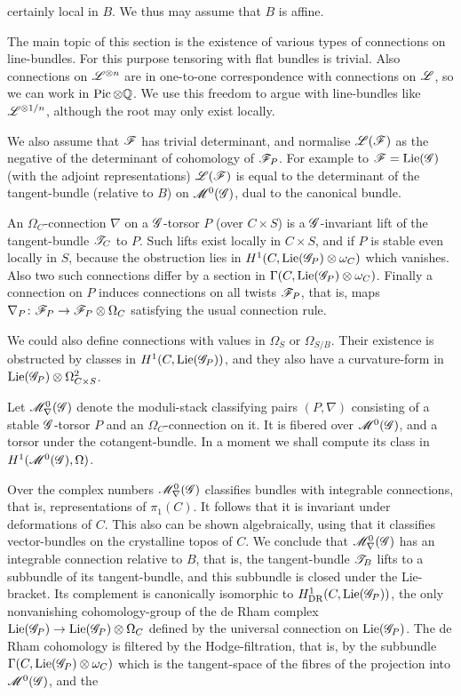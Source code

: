 \documentclass[12pt,english]{smfart}
\theoremstyle{plain} \newtheorem{innerthm}{Theorem} \newtheorem{innerlem}{Lemma} \newtheorem{innerprop}{Proposition} \newtheorem{innercor}{Corollary} \theoremstyle{definition} \newtheorem{innerdefn}{Definition} \newtheorem{innerconstr}{Construction} \theoremstyle{remark} \newtheorem*{remark}{Remark} \newtheorem*{remarks}{Remarks} \newtheorem*{applications}{Applications}
\begin{document}

certainly local in $B$. We thus may assume that $B$ is affine.

The main topic of this section is the existence of various types of connections on line-bundles. For this purpose tensoring with flat bundles is trivial. Also connections on $\mathscr{L}^{\otimes n}$ are in one-to-one correspondence with connections on $\mathscr{L}$, so we can work in $\operatorname{Pic}\otimes\mathbb{Q}$. We use this freedom to argue with line-bundles like $\mathscr{L}^{\otimes 1/n}$, although the root may only exist locally.

We also assume that $\mathscr{F}$ has trivial determinant, and normalise $\mathscr{L}(\mathscr{F})$ as the negative of the determinant of cohomology of $\mathscr{F}_P$. For example to $\mathscr{F}=\operatorname{Lie}(\mathscr{G})$ (with the adjoint representations) $\mathscr{L}(\mathscr{F})$ is equal to the determinant of the tangent-bundle (relative to $B$) on $\mathscr{M}^0(\mathscr{G})$, dual to the canonical bundle.

An $\Omega_C$-connection $\nabla$ on a $\mathscr{G}$-torsor $P$ (over $C\times S$) is a $\mathscr{G}$-invariant lift of the tangent-bundle $\mathscr{T}_C$ to $P$. Such lifts exist locally in $C\times S$, and if $P$ is stable even locally in $S$, because the obstruction lies in $H^1(C,\operatorname{Lie}(\mathscr{G}_P)\otimes\omega_C)$ which vanishes. Also two such connections differ by a section in $\Gamma(C,\operatorname{Lie}(\mathscr{G}_P)\otimes\omega_C)$. Finally a connection on $P$ induces connections on all twists $\mathscr{F}_P$, that is, maps $\nabla_P\colon\mathscr{F}_P\to\mathscr{F}_P\otimes\Omega_C$ satisfying the usual connection rule.

We could also define connections with values in $\Omega_S$ or $\Omega_{S/B}$. Their existence is obstructed by classes in $H^1(C,\operatorname{Lie}(\mathscr{G}_P))$, and they also have a curvature-form in $\operatorname{Lie}(\mathscr{G}_P)\otimes\Omega^2_{C\times S}$.

Let $\mathscr{M}^0_\nabla(\mathscr{G})$ denote the moduli-stack classifying pairs $(P,\nabla)$ consisting of a stable $\mathscr{G}$-torsor $P$ and an $\Omega_C$-connection on it. It is fibered over $\mathscr{M}^0(\mathscr{G})$, and a torsor under the cotangent-bundle. In a moment we shall compute its class in $H^1(\mathscr{M}^0(\mathscr{G}),\Omega)$.

Over the complex numbers $\mathscr{M}^0_\nabla(\mathscr{G})$ classifies bundles with integrable connections, that is, representations of $\pi_1(C)$. It follows that it is invariant under deformations of $C$. This also can be shown algebraically, using that it classifies vector-bundles on the crystalline topos of $C$. We conclude that $\mathscr{M}^0_\nabla(\mathscr{G})$ has an integrable connection relative to $B$, that is, the tangent-bundle $\mathscr{T}_B$ lifts to a subbundle of its tangent-bundle, and this subbundle is closed under the Lie-bracket. Its complement is canonically isomorphic to $H_{\mathrm{DR}}^1(C,\operatorname{Lie}(\mathscr{G}_P))$, the only nonvanishing cohomology-group of the de Rham complex $\operatorname{Lie}(\mathscr{G}_P)\to\operatorname{Lie}(\mathscr{G}_P)\otimes\Omega_C$ defined by the universal connection on $\operatorname{Lie}(\mathscr{G}_P)$. The de Rham cohomology is filtered by the Hodge-filtration, that is, by the subbundle $\Gamma(C,\operatorname{Lie}(\mathscr{G}_P)\otimes\omega_C)$ which is the tangent-space of the fibres of the projection into $\mathscr{M}^0(\mathscr{G})$, and the
\end{document}
